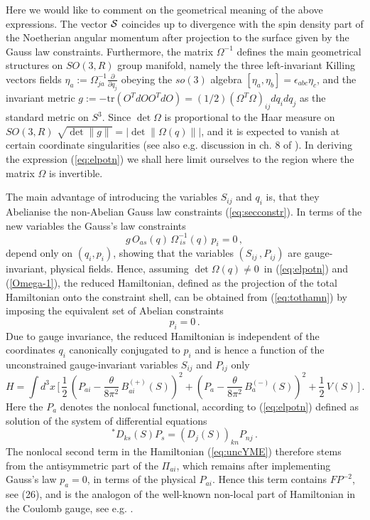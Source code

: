 \documentclass[a4paper,12pt]{article}
\begin{document}
Here we would like to comment on the geometrical meaning of the above expressions.
The vector ${\cal S} $ coincides up to divergence with the spin density part
of the Noetherian angular momentum after projection to the surface given by
the Gauss law constraints.
Furthermore, the matrix $\Omega^{-1}$ defines the main geometrical
structures on $SO(3,R)$ group manifold, namely the three
left-invariant Killing vectors fields
$\eta_a :=\Omega^{-1}_{ja} \frac{\partial}{\partial q_j}$ obeying the
$so(3)$ algebra $[ \eta_a, \eta_b]= \epsilon_{abc}\eta_c$,
and the invariant  metric $g:=-\mbox{tr}\left(O^TdO O^TdO\right)=
(1/2)\left(\Omega^T\Omega\right)_{ij}dq_idq_j$
as the standard metric on $S^3$.
Since $\det\Omega$ is proportional to the Haar measure
on $SO(3, R)$ $\sqrt{\det \|g\|} =|\det\|\Omega(q)\||$,
and it is expected to vanish at certain coordinate singularities
(see also e.g. discussion in  ch. 8 of \cite{Creutz}).
In deriving the expression (\ref{eq:elpotn}) we shall here limit ourselves to
the region where the matrix $\Omega$ is invertible.

The main advantage of introducing the variables $S_{ij}$ and $q_i$
is, that they Abelianise the non-Abelian Gauss law constraints
(\ref{eq:secconstr}).
In terms of the new variables the Gauss's law constraints
\begin{equation}
\label{Omega-1}
g \, O_{as}(q)\, \Omega^{-1}_{\ is}(q)\, p_i = 0\,,
\end{equation}
depend only on $(q_i,p_i)$, showing
that the variables $(S_{ij} \,, P_{ij})$ are gauge-invariant, physical fields.
Hence, assuming $\det\Omega(q)\ne 0$\
in (\ref{eq:elpotn}) and (\ref{Omega-1}),
the reduced Hamiltonian, defined as the projection of the
total Hamiltonian onto the constraint shell,
can be obtained from (\ref{eq:tothamn}) by
imposing the equivalent set of Abelian constraints
\begin{equation}
\label{p_a=0}
 p_i = 0\,.
\end{equation}
Due to gauge invariance, the reduced Hamiltonian is
independent of the coordinates $q_i$  canonically conjugated
to $p_i$ and is hence a function  of the unconstrained
gauge-invariant variables $S_{ij}$ and $P_{ij}$ only
\begin{equation}
\label{eq:uncYME}
H = \int d^3{x}\, \biggl[\,
\frac{1}{2}\, \left( P_{ai} - \frac{\theta}{8 \pi^2}\, B^{(+)}_{ai}(S)
\right)^2 +
\left( P_a - \frac{\theta}{8 \pi^2}\, B^{(-)}_{a}(S)\right)^2 +
\frac{1}{2}\, V(S)\,
\biggr]\,.
\end{equation}
Here the $P_a$ denotes the nonlocal functional,
according to (\ref{eq:elpotn}) defined as solution of the system of
differential equations
\begin{equation}
\label{vecE}
{}^\ast\! D_{ks}(S) P_s = (D_j(S))_{kn}P_{nj}\,.
\end{equation}
The nonlocal second term in the Hamiltonian (\ref{eq:uncYME})
therefore stems from the antisymmetric part of the
$\Pi_{ai}$, which remains after implementing Gauss's law $p_a = 0$,
in terms of the physical $P_{ai}$. Hence this term contains $FP^{-2}$,
see (26), and is the analogon of the
well-known non-local part of Hamiltonian in the Coulomb gauge,
see e.g. \cite{ChrLee}.
\end{document}
